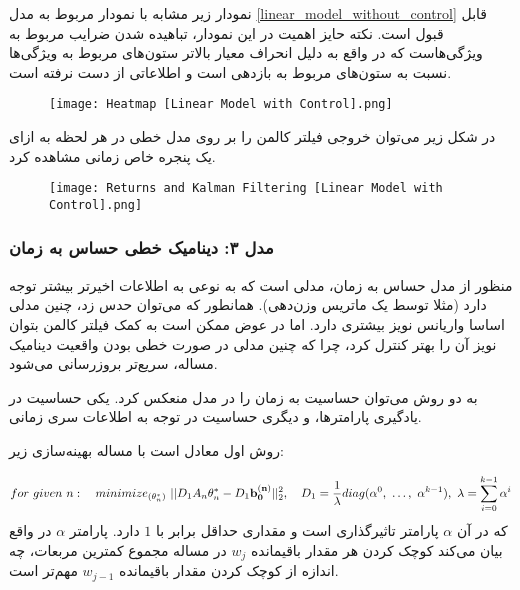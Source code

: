 \documentclass{scribe-cgenomics}
\begin{document}
\begin{مشاهده}
نمودار زیر مشابه با نمودار مربوط به مدل
\ref{linear_model_without_control}
قابل قبول است. نکته حایز اهمیت در این نمودار، تباهیده شدن ضرایب مربوط به ویژگی‌هاست که در واقع به دلیل انحراف معیار بالاتر ستون‌های مربوط به ویژگی‌ها نسبت به ستون‌های مربوط به بازدهی است و اطلاعاتی از دست نرفته است.

\begin{figure}[h]
\texttt{[image: Heatmap [Linear Model with Control].png]}
\centering
\end{figure}
\end{مشاهده}

\begin{نتیجه}
در شکل زیر می‌توان خروجی فیلتر کالمن را بر روی مدل خطی در هر لحظه به ازای یک پنجره خاص زمانی مشاهده کرد.

\begin{figure}[h]
\texttt{[image: Returns and Kalman Filtering [Linear Model with Control].png]}
\centering
\end{figure}
\end{نتیجه}




\subsubsection{مدل ۳: دینامیک خطی حساس به زمان}
منظور از مدل حساس به زمان، مدلی است که به نوعی به  اطلاعات اخیرتر بیشتر توجه دارد (مثلا توسط یک ماتریس وزن‌دهی). همانطور که می‌توان حدس زد، چنین مدلی اساسا واریانس نویز بیشتری دارد. اما در عوض ممکن است به کمک فیلتر کالمن بتوان نویز آن را بهتر کنترل کرد، چرا که چنین مدلی در صورت خطی بودن واقعیت دینامیک مساله، سریع‌تر بروزرسانی می‌شود.

به دو روش می‌توان حساسیت به زمان را در مدل منعکس کرد. یکی حساسیت در یادگیری پارامترها، و دیگری حساسیت در توجه به اطلاعات سری زمانی.

روش اول معادل است با مساله بهینه‌سازی زیر:

\begin{equation}\label{first_weighted_linear_model_with_control_optimization}
for\ given\ n:\quad minimize_{(\theta^*_n)}\ ||D_1A_n\theta^*_n - D_1\bold{b^{(n)}_0}||_2^2,
\quad
D_1 = \dfrac{1}{\lambda}diag(\alpha^0,\ \dots, \ \alpha^{k-1}),\ \lambda= \sum_{i=0}^{k-1} \alpha^i
\end{equation}
که در آن
$\alpha$
پارامتر تاثیرگذاری است و مقداری حداقل برابر با
$1$
دارد. پارامتر
$\alpha$
در واقع بیان می‌کند کوچک کردن هر مقدار باقیمانده
$w_j$
در مساله مجموع کمترین مربعات، چه اندازه از کوچک کردن مقدار باقیمانده
$w_{j-1}$
مهم‌تر است.
\end{document}
